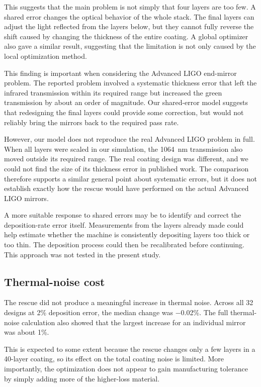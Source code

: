 This suggests that the main problem is not simply that four layers are too few. A shared error changes the optical behavior of the whole stack. The final layers can adjust the light reflected from the layers below, but they cannot fully reverse the shift caused by changing the thickness of the entire coating. A global optimizer also gave a similar result, suggesting that the limitation is not only caused by the local optimization method.

This finding is important when considering the Advanced LIGO end-mirror problem. The reported problem involved a systematic thickness error that left the infrared transmission within its required range but increased the green transmission by about an order of magnitude. Our shared-error model suggests that redesigning the final layers could provide some correction, but would not reliably bring the mirrors back to the required pass rate.

However, our model does not reproduce the real Advanced LIGO problem in full. When all layers were scaled in our simulation, the 1064~nm transmission also moved outside its required range. The real coating design was different, and we could not find the size of its thickness error in published work. The comparison therefore supports a similar general point about systematic errors, but it does not establish exactly how the rescue would have performed on the actual Advanced LIGO mirrors.

A more suitable response to shared errors may be to identify and correct the deposition-rate error itself. Measurements from the layers already made could help estimate whether the machine is consistently depositing layers too thick or too thin. The deposition process could then be recalibrated before continuing. This approach was not tested in the present study.

\subsection{Thermal-noise cost}

The rescue did not produce a meaningful increase in thermal noise. Across all 32 designs at 2\% deposition error, the median change was $-$0.02\%. The full thermal-noise calculation also showed that the largest increase for an individual mirror was about 1\%.

This is expected to some extent because the rescue changes only a few layers in a 40-layer coating, so its effect on the total coating noise is limited. More importantly, the optimization does not appear to gain manufacturing tolerance by simply adding more of the higher-loss material.

